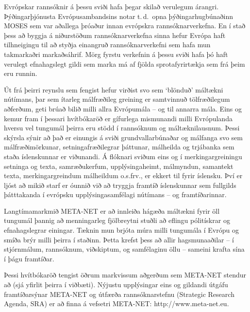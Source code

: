 \documentclass{../../metanetpaper}
\begin{document}
\begin{multicols}{2}
Evrópskar rannsóknir á þessu sviði hafa þegar skilað verulegum árangri. Þýðingarþjónusta Evrópusambandsins notar t.\,d.~opna þýðingarhugbúnaðinn MOSES sem var aðallega þróaður innan evrópskra rannsóknarverkefna. En í stað þess að byggja á niðurstöðum rannsóknarverkefna sinna hefur Evrópa haft tilhneigingu til að styðja einangruð rannsóknarverkefni sem hafa mun takmarkaðri markaðsáhrif. Mörg fyrstu verkefnin á þessu sviði hafa þó haft verulegt efnahagslegt gildi sem marka má af fjölda sprotafyrirtækja sem frá þeim eru runnin.


Út frá þeirri reynslu sem fengist hefur virðist svo sem ‘blönduð’ máltækni nútímans, þar sem ítarleg málfræðileg greining er samtvinnuð tölfræðilegum aðferðum, geti brúað bilið milli allra Evrópumála -- og til annarra mála. Eins og kemur fram í þessari hvítbókaröð er gífurlega mismunandi milli Evrópulanda hversu vel tungumál þeirra eru stödd í rannsóknum og máltæknilausnum. Þessi skýrsla sýnir að það er einungis á sviði grundvallarbúnaðar og málfanga svo sem málfræðimörkunar, setningafræðilegrar þáttunar, málheilda og trjábanka sem staða íslenskunnar er viðunandi. Á flóknari sviðum eins og í merkingargreiningu setninga og texta, samræðukerfum, upplýsingaheimt, málmyndun, samantekt texta, merkingargreindum málheildum o.s.frv., er ekkert til fyrir íslensku. Því er ljóst að mikið starf er óunnið við að tryggja framtíð íslenskunnar sem fullgilds þátttakanda í evrópsku upplýsingasamfélagi nútímans -- og framtíðarinnar.

Langtímamarkmið META-NET er að innleiða hágæða máltækni fyrir öll tungumál þannig að menningarleg fjölbreytni stuðli að eflingu pólitískrar og efnahagslegrar einingar. Tæknin mun brjóta múra milli tungumála í Evrópu og smíða brýr milli þeirra í staðinn. Þetta krefst þess að allir hagsmunaaðilar -- í stjórnmálum, rannsóknum, viðskiptum, og samfélaginu öllu -- sameini krafta sína í þágu framtíðar. 

Þessi hvítbókaröð tengist öðrum markvissum aðgerðum sem META-NET stendur að (sjá yfirlit þeirra í viðbæti). Nýjustu upplýsingar eins og gildandi útgáfu framtíðarsýnar \cite{Meta1} META-NET og útfærða rannsóknarstefnu (Strategic Research Agenda, SRA) er að finna á vefsetri META-NET: http://www.meta-net.eu.
\end{multicols}

\clearpage

\end{document}

